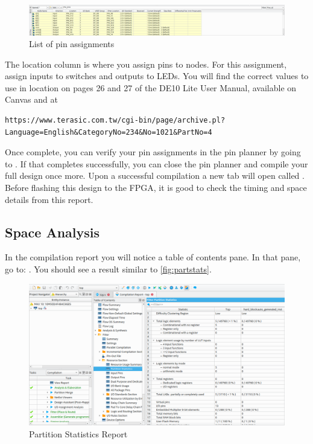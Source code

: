 \documentclass[12pt]{labmanual}
\begin{document}
\begin{figure}
    \centering
    \includegraphics[width=\linewidth]{pinplannerpins.png}
    \caption{List of pin assignments}
    \label{fig:pinlist}
\end{figure}

The location column is where you assign pins to nodes. For this assignment, assign inputs to switches and outputs to LEDs. You will find the correct values to use in location on pages 26 and 27 of the DE10 Lite User Manual, available on Canvas and at 
\footnotesize
\begin{verbatim}
https://www.terasic.com.tw/cgi-bin/page/archive.pl?Language=English&CategoryNo=234&No=1021&PartNo=4
\end{verbatim}
\normalsize
Once complete, you can verify your pin assignments in the pin planner by going to . If that completes successfully, you can close the pin planner and compile your full design once more. Upon a successful compilation a new tab will open called . Before flashing this design to the FPGA, it is good to check the timing and space details from this report.

\subsection{Space Analysis}
\label{ss:spaceanalysis}
In the compilation report you will notice a table of contents pane. In that pane, go to: . You should see a result similar to \autoref{fig:partstats}.

\begin{figure}
    \centering
    \includegraphics[width=\linewidth]{spacereport.png}
    \caption{Partition Statistics Report}
    \label{fig:partstats}
\end{figure}
\end{document}
